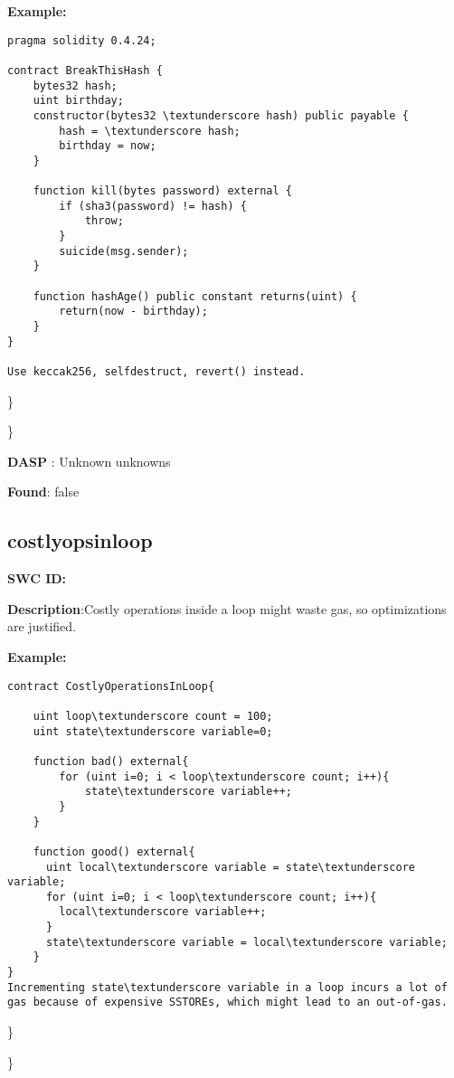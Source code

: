 \documentclass{article}
\begin{document}
\textbf{Example:} 
\begin{verbatim}
pragma solidity 0.4.24;

contract BreakThisHash {
    bytes32 hash;
    uint birthday;
    constructor(bytes32 \textunderscore hash) public payable {
        hash = \textunderscore hash;
        birthday = now;
    }

    function kill(bytes password) external {
        if (sha3(password) != hash) {
            throw;
        }
        suicide(msg.sender);
    }

    function hashAge() public constant returns(uint) {
        return(now - birthday);
    }
}

Use keccak256, selfdestruct, revert() instead.

\end{verbatim}\} 

\} 

\textbf{DASP} : Unknown unknowns

\textbf{Found}: false

\subsection{costly\textunderscore ops\textunderscore in\textunderscore loop} 
\textbf{SWC \textunderscore ID:} 

\textbf{Description}:Costly operations inside a loop might waste gas, so optimizations are justified.


\textbf{Example:} 
\begin{verbatim}
contract CostlyOperationsInLoop{

    uint loop\textunderscore count = 100;
    uint state\textunderscore variable=0;

    function bad() external{
        for (uint i=0; i < loop\textunderscore count; i++){
            state\textunderscore variable++;
        }
    }

    function good() external{
      uint local\textunderscore variable = state\textunderscore variable;
      for (uint i=0; i < loop\textunderscore count; i++){
        local\textunderscore variable++;
      }
      state\textunderscore variable = local\textunderscore variable;
    }
}
Incrementing state\textunderscore variable in a loop incurs a lot of gas because of expensive SSTOREs, which might lead to an out-of-gas.

\end{verbatim}\} 

\} 
\end{document}
